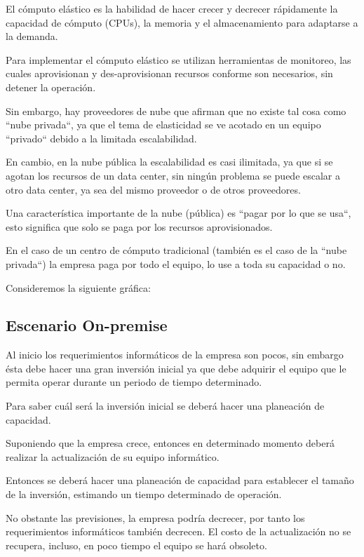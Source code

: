 El cómputo elástico es la habilidad de hacer crecer y decrecer rápidamente la capacidad de cómputo (CPUs), la memoria y el almacenamiento para adaptarse a la demanda.

Para implementar el cómputo elástico se utilizan herramientas de monitoreo, las cuales aprovisionan y des-aprovisionan recursos conforme son necesarios, sin detener la operación.

Sin embargo, hay proveedores de nube que afirman que no existe tal cosa como ``nube privada``, ya que el tema de elasticidad se ve acotado en un equipo ``privado`` debido a la limitada escalabilidad.

En cambio, en la nube pública la escalabilidad es casi ilimitada, ya que si se agotan los recursos de un data center, sin ningún problema se puede escalar a otro data center, ya sea del mismo proveedor o de otros proveedores.

Una característica importante de la nube (pública) es ``pagar por lo que se usa``, esto significa que solo se paga por los recursos aprovisionados.

En el caso de un centro de cómputo tradicional (también es el caso de la ``nube privada``) la empresa paga por todo el equipo, lo use a toda su capacidad o no.

Consideremos la siguiente gráfica:

\subsection{Escenario On-premise}

Al inicio los requerimientos informáticos de la empresa son pocos, sin embargo ésta debe hacer una gran inversión inicial ya que debe adquirir el equipo que le permita operar durante un periodo de tiempo determinado.

Para saber cuál será la inversión inicial  se deberá hacer una planeación de capacidad.

Suponiendo que la empresa crece, entonces en determinado momento deberá realizar la actualización de su equipo informático.

Entonces se deberá hacer una planeación de capacidad para establecer el tamaño de la inversión, estimando un tiempo determinado de operación.

No obstante las previsiones, la empresa podría decrecer, por tanto los requerimientos informáticos también decrecen. El costo de la actualización no se recupera, incluso, en poco tiempo el equipo se hará obsoleto.

